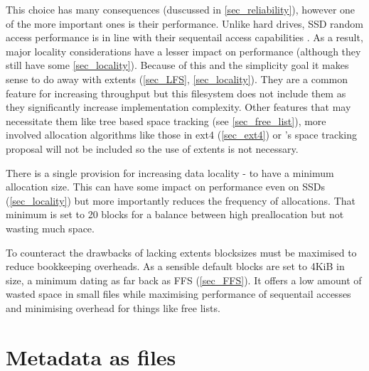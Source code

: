         This choice has many consequences (duscussed in \ref{sec_reliability}),
        however one of the more important ones is their performance. Unlike
        hard drives, SSD random access performance is in line with their
        sequentail access capabilities \cite{servethehome_review}. As a result,
        major locality considerations have a lesser impact on performance
        (although they still have some \ref{sec_locality}). Because of this and
        the simplicity goal it makes sense to do away with extents
        (\ref{sec_LFS}, \ref{sec_locality}). They are a common feature for
        increasing throughput but this filesystem does not include them as they
        significantly increase implementation complexity. Other features that
        may necessitate them like tree based space tracking (see
        \ref{sec_free_list}), more involved allocation algorithms like those in
        ext4 (\ref{sec_ext4}) or \citeauthor{ext4_space_maps}'s space tracking
        proposal will not be included so the use of extents is not necessary.

        There is a single provision for increasing data locality - to have a
        minimum allocation size. This can have some impact on performance even
        on SSDs (\ref{sec_locality}) but more importantly reduces the frequency
        of allocations. That minimum is set to 20 blocks for a balance between
        high preallocation but not wasting much space.

        To counteract the drawbacks of lacking extents blocksizes must be
        maximised to reduce bookkeeping overheads. As a sensible default blocks
        are set to 4KiB in size, a minimum dating as far back as FFS
        (\ref{sec_FFS}). It offers a low amount of wasted space in small files
        while maximising performance of sequentail accesses and minimising
        overhead for things like free lists.

    \section{Metadata as files}
        \label{sec_files}

